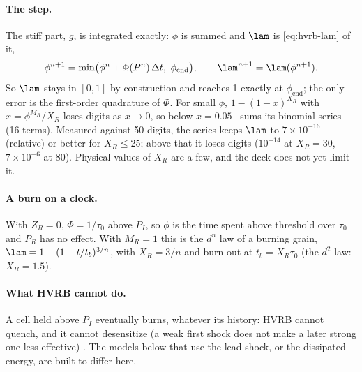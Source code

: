 \paragraph{The step.} The stiff part, $g$, is integrated exactly: $\phi$ is
summed and $\lam$ is \cref{eq:hvrb-lam} of it,
\begin{equation}
  \phi^{n+1} = \min\bigl(\phi^n + \Phi(P^n)\,\Delta t,\ \phi_{\mathrm{end}}\bigr),
  \qquad \lam^{n+1} = \lam(\phi^{n+1}).
  \label{eq:hvrb-step}
\end{equation}
So $\lam$ stays in $[0, 1]$ by construction and reaches 1 exactly at
$\phi_{\mathrm{end}}$; the only error is the first-order quadrature of
$\Phi$. For small $\phi$, $1 - (1 - x)^{X_R}$ with $x = \phi^{M_R}/X_R$ loses
digits as $x \to 0$, so below $x = 0.05$ \bw\ sums its binomial series (16
terms). Measured against 50 digits, the series keeps $\lam$ to $7\times
10^{-16}$ (relative) or better for $X_R \le 25$; above that it loses digits
($10^{-14}$ at $X_R = 30$, $7\times 10^{-6}$ at 80). Physical values of $X_R$
are a few, and the deck does not yet limit it.

\paragraph{A burn on a clock.} With $Z_R = 0$, $\Phi = 1/\tau_0$ above
$P_I$, so $\phi$ is the time spent above threshold over $\tau_0$ and
$P_R$ has no effect. With $M_R = 1$ this is the $d^n$ law of a burning
grain, $\lam = 1 - (1 - t/t_b)^{3/n}$, with $X_R = 3/n$ and burn-out at
$t_b = X_R\tau_0$ (the $d^2$ law: $X_R = 1.5$).

\paragraph{What HVRB cannot do.} A cell held above $P_I$ eventually burns,
whatever its history: HVRB cannot quench, and it cannot desensitize (a weak
first shock does not make a later strong one less effective)
\cite{tuttle2018}. The models below that use the lead shock, or the
dissipated energy, are built to differ here.

